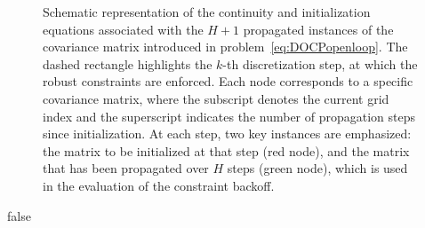 {\begin{figure}
	\caption{Schematic representation of the continuity and initialization equations associated with the $H+1$ propagated instances of the covariance matrix introduced in problem~\eqref{eq:DOCPopenloop}. The dashed rectangle highlights the $k$-th discretization step, at which the robust constraints are enforced. Each node corresponds to a specific covariance matrix, where the subscript denotes the current grid index and the superscript indicates the number of propagation steps since initialization. At each step, two key instances are emphasized: the matrix to be initialized at that step (red node), and the matrix that has been propagated over $H$ steps (green node), which is used in the evaluation of the constraint backoff.}
	\label{fig:DOCPgrid}
\end{figure}
}{false}

